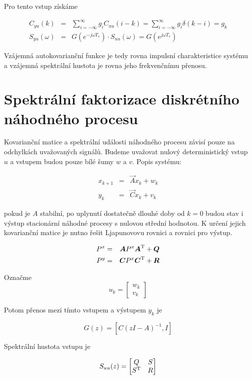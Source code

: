Pro tento vstup získáme

\begin{eqnarray*}
C_{yu}(k) & = & \sum_{i=-\infty}^\infty g_iC_{uu}(i-k) = \sum_{i=-\infty}^\infty g_i\delta(k-i)=g_k\\
S_{yu}(\omega) & = & G\left(e^{-j\omega T_s}\right)\cdot S_{uu}(\omega) = G\left(e^{j\omega T_s}\right)
\end{eqnarray*}

Vzájemná autokovarianční funkce je tedy rovna impulsní charakteristice systému a vzájemná spektrální hustota je rovna jeho frekvenčnímu přenosu.

\section{Spektrální faktorizace diskrétního náhodného procesu}

Kovarianční matice a spektrální události náhodného procesu závisí pouze na odchylkách uvažovaných signálů. Budeme uvažovat nulový deterministický vstup $u$ a vstupem budou pouze bílé šumy $w$ a $v$. Popis systému:

\begin{eqnarray*}
x_{k+1} & = & \vec{A}x_k + w_k\\
y_k & = & \vec{C}x_k + v_k
\end{eqnarray*}

pokud je $A$ stabilní, po uplynutí dostatečně dlouhé doby od $k=0$ budou stav i výstup stacionární náhodné procesy s nulovou střední hodnotou. K určení jejich kovarianční matice je nutno řešit Ljapunovovu rovnici a rovnici pro výstup.

\begin{eqnarray*}
P^x & = & \boldsymbol{A}P^x\boldsymbol{A}^{\mathrm{T}} + \boldsymbol{Q}\\
P^y & = & \boldsymbol{C}P^x\boldsymbol{C}^{\mathrm{T}} + \boldsymbol{R}
\end{eqnarray*}

Označme
\[ u_k =
\begin{bmatrix}
w_k\\v_k
\end{bmatrix}
\]

Potom přenos mezi tímto vstupem a výstupem $y_k$ je

\[ G(z) = [C(zI-A)^{-1}, I] \]

Spektrální hustota vstupu je

\[ S_{uu}(z) =
\begin{bmatrix}
Q & S\\
S^{\mathrm{T}} & R
\end{bmatrix}
\]

